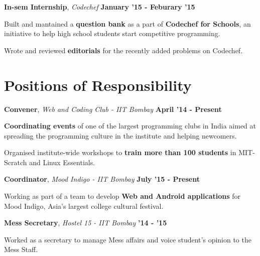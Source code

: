 \documentclass[11pt]{resume}
\begin{document}
\begin{resume}
\textbf{In-sem Internship}, \textsl{Codechef} \hfill \textbf{January '15 - Feburary '15}\\
\vspace{-4mm}
\begin{list2}
\item Built and mantained a \textbf{question bank} as a part of \textbf {Codechef for Schools}, an initiative to help high school students start competitive programming.
\item Wrote and reviewed \textbf{editorials} for the recently added problems on Codechef.
\end{list2}

\section{\mysidestyle Positions of Responsibility}
\textbf{Convener}, \textit{Web and Coding Club - IIT Bombay} \hfill \textbf{April '14 - Present}\\

\vspace{-4mm}
\begin{list2}
\item \textbf{Coordinating events} of one of the largest programming clubs in India aimed at spreading the programming culture in the institute and helping newcomers.
\item Organised institute-wide workshops to \textbf{train more than 100 students} in MIT-Scratch and Linux Essentials.
\end{list2}

\textbf{Coordinator}, \textit{Mood Indigo - IIT Bombay} \hfill \textbf{July '15 - Present}\\
\vspace{-4mm}
\begin{list2}
\item Working as part of a team to develop \textbf{Web and Android applications} for Mood Indigo, Asia's largest college cultural festival. 
\end{list2}

\textbf{Mess Secretary}, \textit{Hostel 15 - IIT Bombay} \hfill \textbf{'14 - '15}\\
\vspace{-4mm}
\begin{list2}
\item Worked as a secretary to manage Mess affairs and voice student's opinion to the Mess Staff.
\end{list2}


\end{resume}
\end{document}
